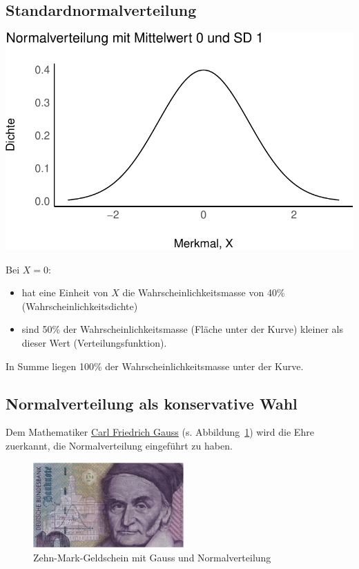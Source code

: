 \documentclass[
  a4paper,
  DIV=11]{scrreprt}
\providecommand{\tightlist}{%
  \setlength{\itemsep}{0pt}\setlength{\parskip}{0pt}}\usepackage{longtable,booktabs,array}
\theoremstyle{definition}
\theoremstyle{remark}
\begin{document}
\hypertarget{standardnormalverteilung}{%
\subsection{Standardnormalverteilung}\label{standardnormalverteilung}}

\includegraphics{./Verteilungen_files/figure-pdf/Normalverteilung-3-1.pdf}

Bei \(X=0\):

\begin{itemize}
\tightlist
\item
  hat eine Einheit von \(X\) die Wahrscheinlichkeitsmasse von 40\%
  (Wahrscheinlichkeitsdichte)
\item
  sind 50\% der Wahrscheinlichkeitsmasse (Fläche unter der Kurve)
  kleiner als dieser Wert (Verteilungsfunktion).
\end{itemize}

In Summe liegen 100\% der Wahrscheinlichkeitsmasse unter der Kurve.

\hypertarget{normalverteilung-als-konservative-wahl}{%
\subsection{Normalverteilung als konservative
Wahl}\label{normalverteilung-als-konservative-wahl}}

Dem Mathematiker
\href{https://de.wikipedia.org/wiki/Carl_Friedrich_Gau\%C3\%9F}{Carl
Friedrich Gauss} (s. Abbildung~\ref{fig-gauss}) wird die Ehre zuerkannt,
die Normalverteilung eingeführt zu haben.

\begin{figure}

{\centering \includegraphics[width=2.27in,height=\textheight]{./img/10_Deutsche_Mark_-_detail.png}

}

\caption{\label{fig-gauss}Zehn-Mark-Geldschein mit Gauss und
Normalverteilung}

\end{figure}
\end{document}
